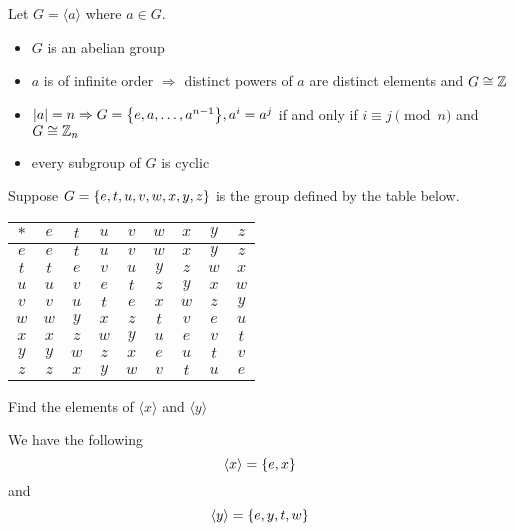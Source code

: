 \begin{remark}
    Let $G = \langle a \rangle$ where $a \in G$.
    \begin{itemize}
        \item $G$ is an abelian group
        \item $a$ is of infinite order $\Rightarrow$ distinct powers of $a$ are distinct elements and $G \cong \mathbb{Z}$
        \item $\qty|a| = n \Rightarrow G = \qty{e, a, \ldots , a^{n-1}}, a^i = a^j$ if and only if $i \equiv j \pmod{n}$ and $G \cong \mathbb{Z}_n$
        \item every subgroup of $G$ is cyclic
    \end{itemize}
\end{remark}

\begin{exercise}
    Suppose $G = \qty{e, t, u, v, w, x, y, z}$ is the group defined by the table below.
    \begin{center}
        \begin{tabular}{c|c c c c c c c c}
             $\ast$ & $e$ & $t$ & $u$ & $v$ & $w$ & $x$ & $y$ & $z$  \\
             \hline
             $e$ & $e$ & $t$ & $u$ & $v$ & $w$ & $x$ & $y$ & $z$  \\
             $t$ & $t$ & $e$ & $v$ & $u$ & $y$ & $z$ & $w$ & $x$  \\
             $u$ & $u$ & $v$ & $e$ & $t$ & $z$ & $y$ & $x$ & $w$  \\
             $v$ & $v$ & $u$ & $t$ & $e$ & $x$ & $w$ & $z$ & $y$  \\
             $w$ & $w$ & $y$ & $x$ & $z$ & $t$ & $v$ & $e$ & $u$  \\
             $x$ & $x$ & $z$ & $w$ & $y$ & $u$ & $e$ & $v$ & $t$  \\
             $y$ & $y$ & $w$ & $z$ & $x$ & $e$ & $u$ & $t$ & $v$  \\
             $z$ & $z$ & $x$ & $y$ & $w$ & $v$ & $t$ & $u$ & $e$  \\
        \end{tabular}
    \end{center}
    Find the elements of $\langle x \rangle$ and $\langle y \rangle$
\end{exercise}

\begin{solution}
    We have the following
    \[ \langle x \rangle = \qty{e, x} \]
    and
    \[ \langle y \rangle = \qty{e, y,  t, w} \]
\end{solution}

